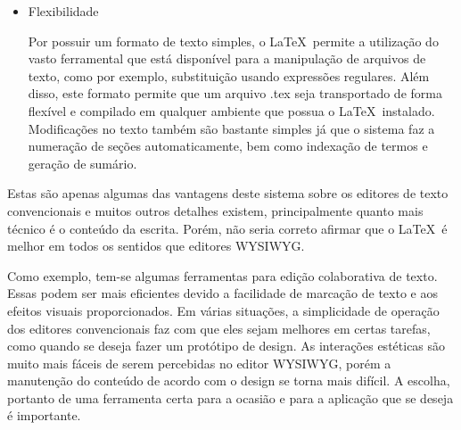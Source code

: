 \begin{itemize}
\item Flexibilidade

Por possuir um formato de texto simples, o \LaTeX\ permite a utilização do vasto ferramental que está disponível para a manipulação de arquivos de texto, como por exemplo, substituição usando expressões regulares. Além disso, este formato permite que um arquivo .tex seja transportado de forma flexível e compilado em qualquer ambiente que possua o \LaTeX\ instalado. Modificações no texto também são bastante simples já que o sistema faz a numeração de seções automaticamente, bem como indexação de termos e geração de sumário.

\end{itemize}

Estas são apenas algumas das vantagens deste sistema sobre os editores de texto convencionais e muitos outros detalhes existem, principalmente quanto mais técnico é o conteúdo da escrita. Porém, não seria correto afirmar que o \LaTeX\ é melhor em todos os sentidos que editores WYSIWYG.

Como exemplo, tem-se algumas ferramentas para edição colaborativa de texto. Essas podem ser mais eficientes devido a facilidade de marcação de texto e aos efeitos visuais proporcionados. Em várias situações, a simplicidade de operação dos editores convencionais faz com que eles sejam melhores em certas tarefas, como quando se deseja fazer um protótipo de design. As interações estéticas são muito mais fáceis de serem percebidas no editor WYSIWYG, porém a manutenção do conteúdo de acordo com o design se torna mais difícil. A escolha, portanto de uma ferramenta certa para a ocasião e para a aplicação que se deseja é importante.

